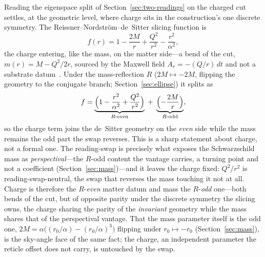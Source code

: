 \documentclass[11pt,a4paper]{article}
\theoremstyle{definition}
\begin{document}
Reading the eigenspace split of Section~\ref{sec:two-readings} on the charged cut settles, at the geometric level, where charge sits in the construction's one discrete symmetry. The Reissner--Nordstr\"om--de~Sitter slicing function is
\begin{equation}\label{eq:RNdS}
  f(r)=1-\frac{2M}{r}+\frac{Q^{2}}{r^{2}}-\frac{r^{2}}{\alpha^{2}},
\end{equation}
the charge entering, like the mass, on the matter side---a bend of the cut, $m(r)=M-Q^{2}/2r$, sourced by the Maxwell field $A_r=-(Q/r)\,dt$ and not a substrate datum~\cite{JanzenRange}. Under the mass-reflection $R$ ($2M\mapsto-2M$, flipping the geometry to the conjugate branch; Section~\ref{sec:ellipse}) it splits as
\begin{equation}\label{eq:RNsplit}
  f=\underbrace{\Bigl(1-\frac{r^{2}}{\alpha^{2}}+\frac{Q^{2}}{r^{2}}\Bigr)}_{R\text{-even}}\;+\;\underbrace{\Bigl(-\frac{2M}{r}\Bigr)}_{R\text{-odd}},
\end{equation}
so the charge term joins the de~Sitter geometry on the \emph{even} side while the mass remains the odd part the swap reverses. This is a sharp statement about charge, not a formal one. The reading-swap is precisely what exposes the Schwarzschild mass as \emph{perspectival}---the $R$-odd content the vantage carries, a turning point and not a coefficient (Section~\ref{sec:mass})---and it leaves the charge fixed: $Q^{2}/r^{2}$ is reading-swap-neutral, the swap that reverses the mass touching it not at all. Charge is therefore the $R$-\emph{even} matter datum and mass the $R$-\emph{odd} one---both bends of the cut, but of opposite parity under the discrete symmetry the slicing owns, the charge sharing the parity of the \emph{invariant} geometry while the mass shares that of the perspectival vantage. That the mass parameter itself is the odd one, $2M=\alpha\bigl((r_{0}/\alpha)-(r_{0}/\alpha)^{3}\bigr)$ flipping under $r_{0}\mapsto-r_{0}$ (Section~\ref{sec:mass}), is the sky-angle face of the same fact; the charge, an independent parameter the reticle offset does not carry, is untouched by the swap.
\end{document}

